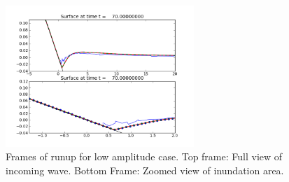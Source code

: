 \begin{figure}[ht]
\vskip 5pt
\hfil\includegraphics[width=2.8in]{bp4/lab-185/frame0005fig2.png}\hfil
\caption{\label{fig:bp2framesa} 
Frames of runup for low amplitude case. Top frame: Full view of incoming wave. Bottom Frame: Zoomed view of inundation area.}
\end{figure}

